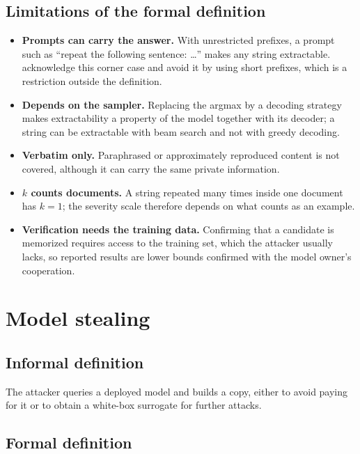 \documentclass[10pt,a4paper]{extarticle}
\theoremstyle{definition}
\begin{document}
\subsection{Limitations of the formal definition}

\begin{itemize}[leftmargin=1.5em]
  \item \textbf{Prompts can carry the answer.} With unrestricted prefixes, a prompt such as \enquote{repeat the following sentence: \ldots} makes any string extractable. \citet{carlini2021extracting} acknowledge this corner case and avoid it by using short prefixes, which is a restriction outside the definition.
  \item \textbf{Depends on the sampler.} Replacing the argmax by a decoding strategy makes extractability a property of the model together with its decoder; a string can be extractable with beam search and not with greedy decoding.
  \item \textbf{Verbatim only.} Paraphrased or approximately reproduced content is not covered, although it can carry the same private information.
  \item \textbf{$k$ counts documents.} A string repeated many times inside one document has $k=1$; the severity scale therefore depends on what counts as an example.
  \item \textbf{Verification needs the training data.} Confirming that a candidate is memorized requires access to the training set, which the attacker usually lacks, so reported results are lower bounds confirmed with the model owner's cooperation.
\end{itemize}

\section{Model stealing}\label{sec:stealing}

\subsection{Informal definition}

The attacker queries a deployed model and builds a copy, either to avoid paying for it or to obtain a white-box surrogate for further attacks.

\subsection{Formal definition}
\end{document}
